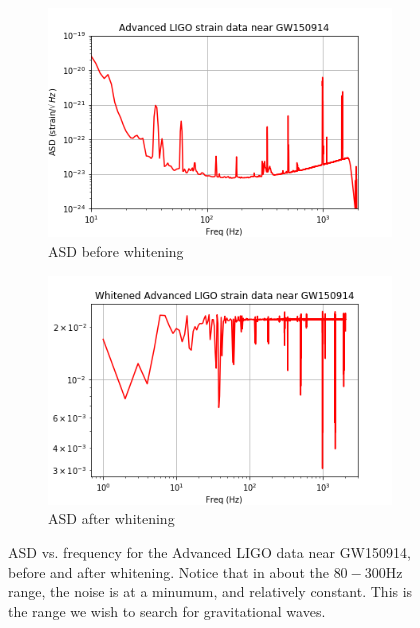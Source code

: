 \documentclass{article}
\begin{document}
\begin{figure}
\begin{subfigure}{\textwidth}
\includegraphics[width=\textwidth]{GW150914_prewhite.png}
\caption{ASD before whitening}
\label{fig:prewhite}
\end{subfigure}

\begin{subfigure}{\textwidth}
\includegraphics[width=\textwidth]{GW150914_white.png}
\caption{ASD after whitening}
\label{fig:postwhite}
\end{subfigure}
\caption{ASD vs. frequency for the Advanced LIGO data near GW150914, before and after whitening. Notice that in about the $80-300\mathrm{Hz}$ range, the noise is at a minumum, and relatively constant. This is the range we wish to search for gravitational waves.}
\label{fig:asd}
\end{figure}
\end{document}
